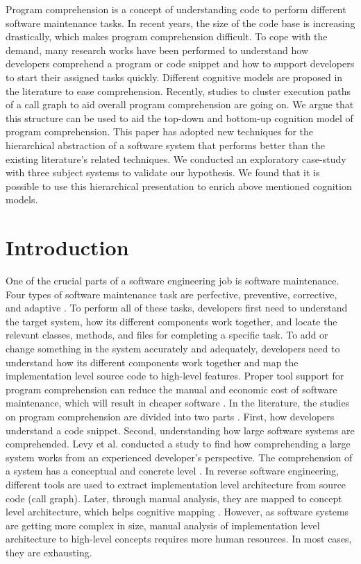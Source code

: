Program comprehension is a concept of understanding code to perform different software maintenance tasks. In recent years, the size of the code base is increasing drastically, which makes program comprehension difficult. To cope with the demand, many research works have been performed to understand how developers comprehend a program or code snippet and how to support developers to start their assigned tasks quickly. Different cognitive models are proposed in the literature to ease comprehension. 
Recently, studies to cluster execution paths of a call graph to aid overall program comprehension are going on.
We argue that this structure can be used to aid the top-down and bottom-up cognition model of program comprehension.
This paper has adopted new techniques for the hierarchical abstraction of a software system that performs better than the existing literature's related techniques. We conducted an exploratory case-study with three subject systems to validate our hypothesis. We found that it is possible to use this hierarchical presentation to enrich above mentioned cognition models.   

\section{Introduction}

One of the crucial parts of a software engineering job is software maintenance. Four types of software maintenance task are perfective, preventive, corrective, and adaptive \cite{williams2010characterizingArchitectureChanges}. To perform all of these tasks, developers first need to understand the target system, how its different components work together, and locate the relevant classes, methods, and files for completing a specific task. To add or change something in the system accurately and adequately, developers need to understand how its different components work together and map the implementation level source code to high-level features. Proper tool support for program comprehension can reduce the manual and economic cost of software maintenance, which will result in cheaper software \cite{arisholm2006impactUMLDocumentation}. In the literature, the studies on program comprehension are divided into two parts \cite{levy2019understandingLargeHierarchical}. First, how developers understand a code snippet. Second, understanding how large software systems are comprehended. Levy et al. \cite{levy2019understandingLargeHierarchical} conducted a study to find how comprehending a large system works from an experienced developer's perspective. The comprehension of a system has a conceptual and concrete level \cite{bass2003softwareArchitecturePractice, levy2019understandingLargeHierarchical}. In reverse software engineering, different tools are used to extract implementation level architecture from source code (call graph). Later, through manual analysis, they are mapped to concept level architecture, which helps cognitive mapping \cite{roy2008softwareArchitectureRecovery}. However, as software systems are getting more complex in size, manual analysis of implementation level architecture to high-level concepts requires more human resources. In most cases, they are exhausting. 


